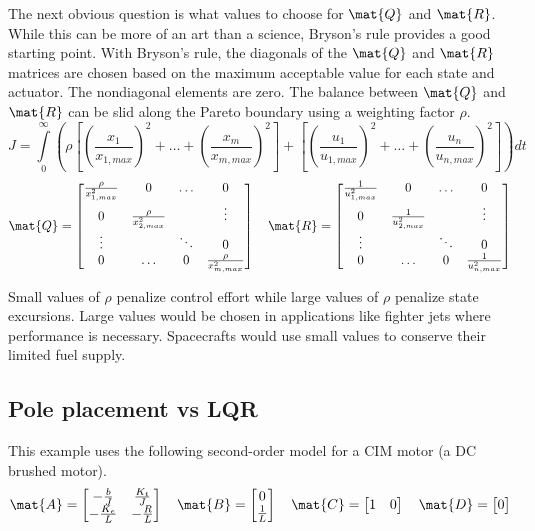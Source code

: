 The next obvious question is what values to choose for $\mat{Q}$ and $\mat{R}$.
While this can be more of an art than a science, Bryson's rule provides a good
starting point. With Bryson's rule, the diagonals of the $\mat{Q}$ and $\mat{R}$
matrices are chosen based on the maximum acceptable value for each \gls{state}
and actuator. The nondiagonal elements are zero. The balance between $\mat{Q}$
and $\mat{R}$ can be slid along the Pareto boundary using a weighting factor
$\rho$.
\begin{equation*}
  J = \int\limits_0^\infty \left(\rho \left[
    \left(\frac{x_1}{x_{1,max}}\right)^2 + \ldots +
    \left(\frac{x_m}{x_{m,max}}\right)^2\right] + \left[
    \left(\frac{u_1}{u_{1,max}}\right)^2 + \ldots +
    \left(\frac{u_n}{u_{n,max}}\right)^2\right]\right) dt
\end{equation*}
\begin{equation*}
  \mat{Q} = \begin{bmatrix}
    \frac{\rho}{x_{1,max}^2} & 0 & \ldots & 0 \\
    0 & \frac{\rho}{x_{2,max}^2} & & \vdots \\
    \vdots & & \ddots & 0 \\
    0 & \ldots & 0 & \frac{\rho}{x_{m,max}^2}
  \end{bmatrix}
  \quad
  \mat{R} = \begin{bmatrix}
    \frac{1}{u_{1,max}^2} & 0 & \ldots & 0 \\
    0 & \frac{1}{u_{2,max}^2} & & \vdots \\
    \vdots & & \ddots & 0 \\
    0 & \ldots & 0 & \frac{1}{u_{n,max}^2}
  \end{bmatrix}
\end{equation*}

Small values of $\rho$ penalize \gls{control effort} while large values of
$\rho$ penalize \gls{state} excursions. Large values would be chosen in
applications like fighter jets where performance is necessary. Spacecrafts would
use small values to conserve their limited fuel supply.

\subsection{Pole placement vs LQR}

This example uses the following second-order \gls{model} for a CIM motor (a DC
brushed motor).
\begin{align*}
  \mat{A} = \begin{bmatrix}
    -\frac{b}{J} & \frac{K_t}{J} \\
    -\frac{K_e}{L} & -\frac{R}{L}
  \end{bmatrix}
  \quad
  \mat{B} = \begin{bmatrix}
    0 \\
    \frac{1}{L}
  \end{bmatrix}
  \quad
  \mat{C} = \begin{bmatrix}
    1 & 0
  \end{bmatrix}
  \quad
  \mat{D} = \begin{bmatrix}
    0
  \end{bmatrix}
\end{align*}

